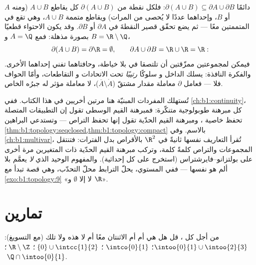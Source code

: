 \begin{example}\label{ex:b1:topology:boundaryunion}
دائمًا $\partial(A \cup B) \subseteq \partial A \cup \partial
B$: فلكل نقطة من $\partial(A \cup B)$ كل 
يقاطع $A \cup B$ (ومنه $A$ أو $B$، وإحداهما عددًا لا يُحصى
من المرات) ويقاطع متممة $A \cup B$، وهي تقع في
المتممتين معًا --- ثم يضع تحقّق قصير النقطةَ في
$\partial A$ أو $\partial B$. وقد يكون الاحتواء قطعيًا
بصورة مذهلة: فمع $A = \Q$ و $B = \R\setminus\Q$،
\[
\partial(A \cup B) = \partial \R = \emptyset ,
\qquad
\partial A \cup \partial B = \R \cup \R = \R :
\]
فيمكن لمجموعتين ممزّقتين أن تلتصقا في  بلا خياطة، وحافتاهما
تفني إحداهما الأخرى. والفكرة النافذة: يسلك الداخل و
 سلوكًا \emph{رتيبًا} تحت الاتحادات و
التقاطعات، وأمّا الحواف فلا --- فعامل $\partial$ معاملة
مقدار مشتقّ ($\overline A \setminus \mathring A$)، لا معاملة
مؤثر له جبرُه الخاص.
\end{example}

\begin{remark}
تُستهلك المفردات المبنيّة هنا مرتين أخريين في هذا الكتاب.
ففي \cref{ch:b1:continuity}، كل مبرهنة  طوبولوجية
متنكّرة: فمبرهنة القيم الوسطى تقول إن التطبيقات
المتصلة تحفظ خاصية ، ومبرهنة القيم
الحدّية تقول إنها تحفظ التراص --- وتستدعي البراهين
\cref{thm:b1:topology:seqclosed,thm:b1:topology:compact}
بالاسم. وفي \cref{ch:b1:multivar}، تُقرأ التعاريف نفسها
ثانيةً في $\R^2$ بالأقراص بدل الفترات: فتنتقل المجموعات 
 والتراص كلمةً كلمة، وتركب مبرهنة القيم الحدّية
ذات المتغيرين مرة أخرى على
بولتزانو--فايرشتراس (استخرج على كل إحداثية). والمفهوم الوحيد الذي
\emph{لا} يعمَّم بلا ألم هو  نفسها --- ففي المستوي،
يحلّ الترابط محلّ التحدّب، وهي قصة تبدأ مع
 \cref{exo:b1:topology:9} «لا   إلا $\emptyset$
و $\R$».
\end{remark}

\section{تمارين}

\begin{exercise}[$\star$]\label{exo:b1:topology:1}
من أجل كل ، قل هل هي  أم  أم الاثنتان معًا أم لا هذه ولا تلك (مع
التسويغ): $\intoo{0}{1} \cup \intoo{2}{3}$؛ $\;\intco{0}{1}$؛
$\;\{0\} \cup \intcc{1}{2}$؛ $\;\R \setminus \Z$؛ $\;\Q \cap
\intoo{0}{1}$.
\end{exercise}

